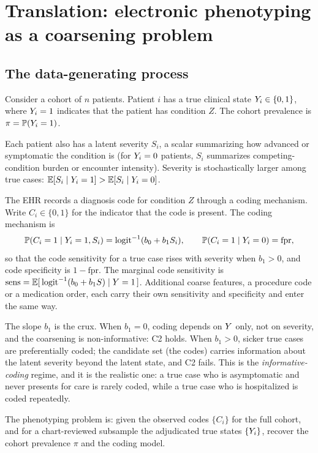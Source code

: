 \section{Translation: electronic phenotyping as a coarsening problem}
\label{sec:translation}

\subsection{The data-generating process}

Consider a cohort of $n$ patients. Patient $i$ has a true clinical
state $Y_i \in \{0,1\}$, where $Y_i = 1$ indicates that the patient
has condition $Z$. The cohort prevalence is $\pi = \mathbb{P}(Y_i = 1)$.

Each patient also has a latent severity $S_i$, a scalar summarizing how
advanced or symptomatic the condition is (for $Y_i = 0$ patients, $S_i$
summarizes competing-condition burden or encounter intensity). Severity
is stochastically larger among true cases: $\mathbb{E}[S_i \mid Y_i = 1] >
\mathbb{E}[S_i \mid Y_i = 0]$.

The EHR records a diagnosis code for condition $Z$ through a coding
mechanism. Write $C_i \in \{0,1\}$ for the indicator that the code is
present. The coding mechanism is
\begin{equation}
  \mathbb{P}(C_i = 1 \mid Y_i = 1, S_i)
    = \mathrm{logit}^{-1}(b_0 + b_1 S_i),
  \qquad
  \mathbb{P}(C_i = 1 \mid Y_i = 0)
    = \mathrm{fpr},
  \label{eq:trans-coding}
\end{equation}
so that the code sensitivity for a true case rises with severity when
$b_1 > 0$, and code specificity is $1 - \mathrm{fpr}$. The marginal
code sensitivity is $\mathrm{sens} = \mathbb{E}[\,\mathrm{logit}^{-1}(b_0 + b_1
S) \mid Y = 1\,]$. Additional coarse features, a procedure code or a
medication order, each carry their own sensitivity and specificity and
enter the same way.

The slope $b_1$ is the crux. When $b_1 = 0$, coding depends on $Y$
only, not on severity, and the coarsening is non-informative: C2 holds.
When $b_1 > 0$, sicker true cases are preferentially coded; the
candidate set (the codes) carries information about the latent severity
beyond the latent state, and C2 fails. This is the
\emph{informative-coding} regime, and it is the realistic one: a true
case who is asymptomatic and never presents for care is rarely coded,
while a true case who is hospitalized is coded repeatedly.

The phenotyping problem is: given the observed codes $\{C_i\}$ for the
full cohort, and for a chart-reviewed subsample the adjudicated true
states $\{Y_i\}$, recover the cohort prevalence $\pi$ and the coding
model.

